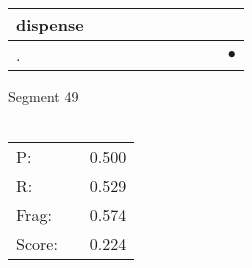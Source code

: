 \documentclass[landscape]{article}
\newcommand{\ssp}{\hspace{2pt}}
\newcommand{\mex}{\cellcolor{g}$\bullet$}
\begin{document}
\begin{tabular}{|l|p{10pt}|p{10pt}|p{10pt}|p{10pt}|p{10pt}|p{10pt}|p{10pt}|p{10pt}|p{10pt}|}
\hline
\ssp dispense \ssp&\hspace{2pt}&\hspace{2pt}&\hspace{2pt}&\hspace{2pt}&\hspace{2pt}&\hspace{2pt}&\hspace{2pt}&\hspace{2pt}&\hspace{2pt}\\
\hline
\ssp \cellcolor{ref8}. \ssp&\hspace{2pt}&\hspace{2pt}&\hspace{2pt}&\hspace{2pt}&\hspace{2pt}&\hspace{2pt}&\hspace{2pt}&\hspace{2pt}&\hspace{2pt}\mex\\
\hline
\end{tabular}

\vspace{6pt}
\noindent Segment 49\\\\
\noindent\begin{tabular}{lm{12pt}r}
\hline
P:&&0.500\\
R:&&0.529\\
Frag:&&0.574\\
Score:&&0.224\\
\end{tabular}

\newpage
\end{document}
